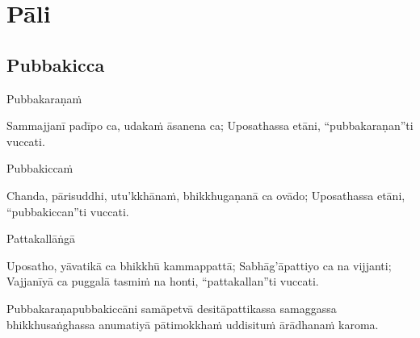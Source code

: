 
\chapter{Pāli}

\clearpage

\section{Pubbakicca}
\label{pubbakicca}

Pubbakaraṇaṁ

Sammajjanī padīpo ca, udakaṁ āsanena ca;
Uposathassa etāni, “pubbakaraṇan''ti vuccati.

Pubbakiccaṁ

Chanda, pārisuddhi, utu'kkhānaṁ, bhikkhugaṇanā ca ovādo;
Uposathassa etāni, “pubbakiccan''ti vuccati.

Pattakallāṅgā

Uposatho, yāvatikā ca bhikkhū kammappattā;
Sabhāg'āpattiyo ca na vijjanti;
Vajjanīyā ca puggalā tasmiṁ na honti, “pattakallan''ti vuccati.

Pubbakaraṇapubbakiccāni samāpetvā desitāpattikassa samaggassa bhikkhusaṅghassa anumatiyā pātimokkhaṁ uddisituṁ ārādhanaṁ karoma.

\clearpage
